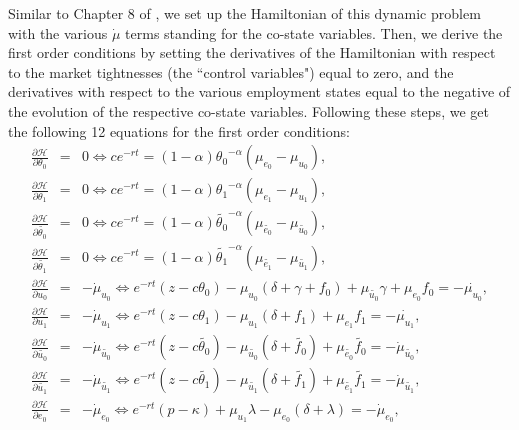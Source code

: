 \documentclass[12pt]{article} %
\theoremstyle{definition}
\begin{document}
\begin{appendix}
Similar to Chapter 8 of \cite{pissarides2000equilibrium}, we set up the Hamiltonian of this dynamic problem with the various $\dot{\mu}$ terms standing for the co-state variables. Then, we derive the first order conditions by setting the derivatives of the Hamiltonian with respect to the market tightnesses (the ``control variables") equal to zero, and the derivatives with respect to the various employment states equal to the negative of the evolution of the respective co-state variables. Following these steps, we get the following 12 equations for the first order conditions:
\begin{eqnarray}
    \frac{\partial \mathcal{H}}{\partial \theta_0} &=& 0 \iff ce^{-rt}=(1-\alpha){\theta_0}^{-\alpha} (\mu_{e_0}-\mu_{u_0}), \label{foc1} \\
    \frac{\partial \mathcal{H}}{\partial \theta_1} &=& 0 \iff ce^{-rt}=(1-\alpha){\theta_1}^{-\alpha} (\mu_{e_1}-\mu_{u_1}), \label{foc2}\\
     \frac{\partial \mathcal{H}}{\partial \tilde{\theta_0}} &=& 0 \iff ce^{-rt}=(1-\alpha){\tilde{\theta_0}}^{-\alpha} (\mu_{\tilde{e_0}}-\mu_{\tilde{u_0}}), \label{foc3}\\
      \frac{\partial \mathcal{H}}{\partial \tilde{\theta_1}} &=& 0 \iff ce^{-rt}=(1-\alpha){\tilde{\theta_1}}^{-\alpha} (\mu_{\tilde{e_1}}-\mu_{\tilde{u_1}}), \label{foc4}\\
      \frac{\partial \mathcal{H}}{\partial u_0} &=& -\dot{\mu}_{u_0} \iff e^{-rt}(z-c\theta_0)-\mu_{u_0}(\delta+\gamma+f_0)+\mu_{\tilde{u_0}}\gamma + \mu_{e_0}f_0= -\dot{\mu_{u_0}}, \label{foc5}\\
       \frac{\partial \mathcal{H}}{\partial u_1} &=& -\dot{\mu}_{u_1} \iff e^{-rt}(z-c\theta_1)-\mu_{u_1}(\delta+f_1) + \mu_{e_1}f_1 = -\dot{\mu_{u_1}}, \label{foc6}\\
       \frac{\partial \mathcal{H}}{\partial \tilde{u_0}} &=& -\dot{\mu}_{\tilde{u_0}} \iff e^{-rt}(z-c\tilde{\theta_0})-\mu_{\tilde{u_0}}(\delta+\tilde{f_0}) + \mu_{\tilde{e_0}}\tilde{f_0} = -\dot{\mu}_{\tilde{u_0}}, \label{foc7}\\
      \frac{\partial \mathcal{H}}{\partial \tilde{u_1}} &=& -\dot{\mu}_{\tilde{u_1}} \iff e^{-rt}(z-c\tilde{\theta_1})-\mu_{\tilde{u_1}}(\delta+\tilde{f_1}) + \mu_{\tilde{e_1}}\tilde{f_1} = -\dot{\mu}_{\tilde{u_1}}, \label{foc8}\\ 
      \frac{\partial \mathcal{H}}{\partial e_0}  &=& -\dot{\mu}_{e_0} \iff e^{-rt}(p-\kappa)+\mu_{u_1} \lambda -\mu_{e_0}(\delta + \lambda) = -\dot{\mu}_{e_0}, \label{foc9}\\

\end{eqnarray}
\end{appendix}
\end{document}
